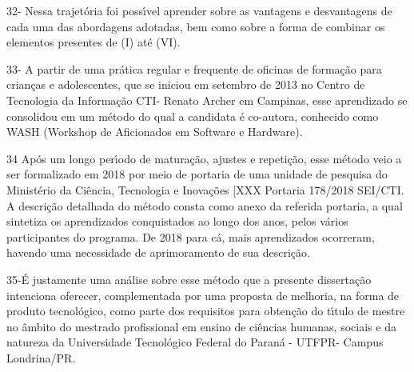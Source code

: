 \documentclass[
12pt,		%
openright,	%
twoside,  %
a4paper,			%
chapter=TITLE,		%
english,			%
french,				%
spanish,			%
brazil				%
]{USPSC-classe/USPSC}
\begin{document}
32- Nessa trajet\'oria foi poss\'{\i}vel aprender sobre as vantagens e desvantagens de cada uma das abordagens adotadas, bem como sobre a forma de combinar os elementos presentes de (I) at\'e (VI).














33- A partir de uma pr\'atica regular e frequente de oficinas de forma\c{c}\~ao para  crian\c{c}as e adolescentes, que se iniciou em setembro de 2013 no Centro de Tecnologia da Informa\c{c}\~ao CTI- Renato Archer em Campinas, esse aprendizado se consolidou em um m\'etodo do qual a candidata \'e co-autora, conhecido como WASH (Workshop de Aficionados em Software e Hardware).














34 Ap\'os um longo per\'{\i}odo de matura\c{c}\~ao, ajustes e repeti\c{c}\~ao, esse m\'etodo veio a ser formalizado em 2018 por meio de portaria de uma unidade de pesquisa do Minist\'erio da Ci\^encia, Tecnologia e Inova\c{c}\~oes [XXX Portaria 178/2018 SEI/CTI. A descri\c{c}\~ao detalhada do m\'etodo consta como anexo da referida portaria, a qual sintetiza os aprendizados conquistados ao longo dos anos, pelos v\'arios participantes do programa. De 2018 para c\'a, mais aprendizados ocorreram, havendo uma necessidade de aprimoramento de sua descri\c{c}\~ao.














35-\'E justamente uma an\'alise sobre esse m\'etodo que a presente disserta\c{c}\~ao intenciona oferecer, complementada por uma proposta de melhoria, na forma de produto tecnol\'ogico, como parte dos requisitos para obten\c{c}\~ao do t\'{\i}tulo de mestre no \^ambito do mestrado profissional em ensino de ci\^encias humanas, sociais e da natureza da Universidade  Tecnol\'ogico  Federal do Paran\'a - UTFPR- Campus Londrina/PR.
\end{document}
